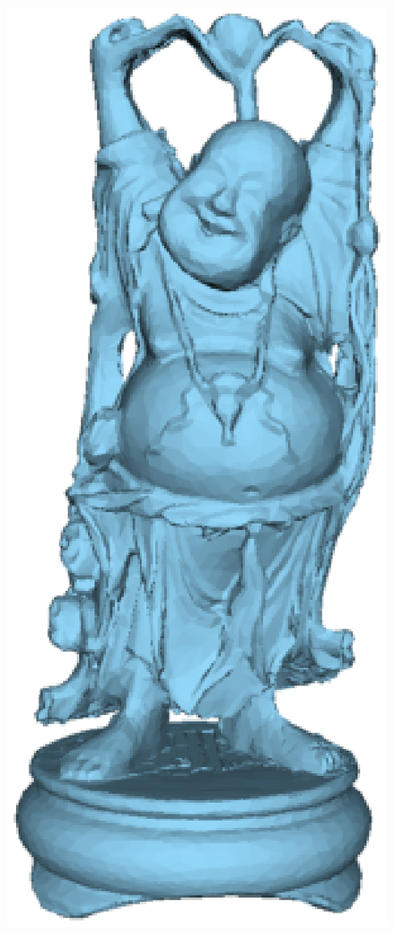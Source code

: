 \documentclass[a4paper,10pt,notitlepage]{scrreprt}
\begin{document}
\begin{figure}
{    \includegraphics[scale=0.4]{budda.eps}}
  \subfloat[Buddha]{\label{fig:buddha2}
}
\end{figure}
\end{document}
